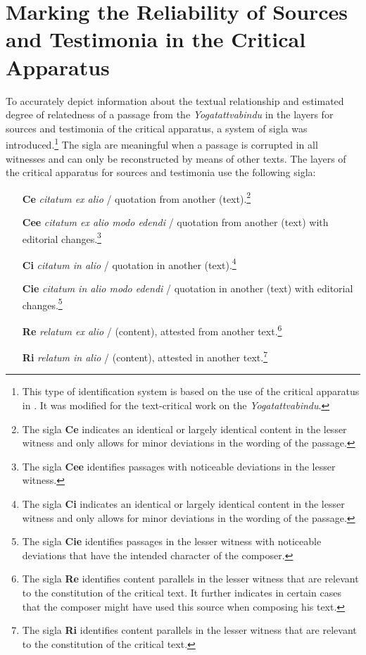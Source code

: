 \section{Marking the Reliability of Sources and Testimonia in the Critical Apparatus}
\label{kennz}

To accurately depict information about the textual relationship and estimated degree of relatedness of a passage from the \textit{Yogatattvabindu} in the layers for sources and testimonia of the critical apparatus, a system of sigla was introduced.\footnote{This type of identification system is based on the use of the critical apparatus in \parencite[lii-liii]{steinkellner2005}. It was modified for the text-critical work on the \textit{Yogatattvabindu}.} The sigla are meaningful when a passage is corrupted in all witnesses and can only be reconstructed by means of other texts. The layers of the critical apparatus for sources and testimonia use the following sigla:

\begin{enumerate}
\item[\textbf{Ce}] \textit{citatum ex alio} / quotation from another (text).\footnote{The sigla \textbf{Ce} indicates an identical or largely identical content in the lesser witness and only allows for minor deviations in the wording of the passage.}
\item[\textbf{Cee}] \textit{citatum ex alio modo edendi} / quotation from another (text) with editorial changes.\footnote{The sigla \textbf{Cee} identifies passages with noticeable deviations in the lesser witness.}
\item[\textbf{Ci}] \textit{citatum in alio} / quotation in another (text).\footnote{The sigla \textbf{Ci} indicates an identical or largely identical content in the lesser witness and only allows for minor deviations in the wording of the passage.}
\item[\textbf{Cie}] \textit{citatum in alio modo edendi} / quotation in another (text) with editorial changes.\footnote{The sigla \textbf{Cie} identifies passages in the lesser witness with noticeable deviations that have the intended character of the composer.}
\item[\textbf{Re}] \textit{relatum ex alio} / (content), attested from another text.\footnote{The sigla \textbf{Re} identifies content parallels in the lesser witness that are relevant to the constitution of the critical text. It further indicates in certain cases that the composer might have used this source when composing his text.}
\item[\textbf{Ri}] \textit{relatum in alio} / (content), attested in another text.\footnote{The sigla \textbf{Ri} identifies content parallels in the lesser witness that are relevant to the constitution of the critical text.}
\end{enumerate}

